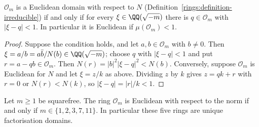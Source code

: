 \begin{lemma}\label{geometry-of-numbers:lemma-euclidean-criterion}
$\mathcal{O}_m$ is a Euclidean domain with respect to $N$ (Definition~\ref{rings:definition-irreducible}) if and only if for every $\xi \in \QQ(\sqrt{-m})$ there is $q \in \mathcal{O}_m$ with $|\xi - q| < 1$.
In particular it is Euclidean if $\mu(\mathcal{O}_m) < 1$.
\end{lemma}

\begin{proof}
Suppose the condition holds, and let $a, b \in \mathcal{O}_m$ with $b \neq 0$. Then $\xi = a/b = a\bar b/N(b) \in \QQ(\sqrt{-m})$; choose $q$ with $|\xi - q| < 1$ and put $r = a - qb \in \mathcal{O}_m$. Then
$N(r) = |b|^2|\xi - q|^2 < N(b)$. Conversely, suppose $\mathcal{O}_m$ is Euclidean for $N$ and let $\xi = z/k$ as above. Dividing $z$ by $k$ gives $z = qk + r$ with $r = 0$ or $N(r) < N(k)$, so
$|\xi - q| = |r|/k < 1$.
\end{proof}

\begin{theorem}\label{geometry-of-numbers:theorem-euclidean-imaginary}
Let $m \geq 1$ be squarefree. The ring $\mathcal{O}_m$ is Euclidean with respect to the norm if and only if $m \in \{1, 2, 3, 7, 11\}$. In particular these five rings are unique factorisation domains.
\end{theorem}

